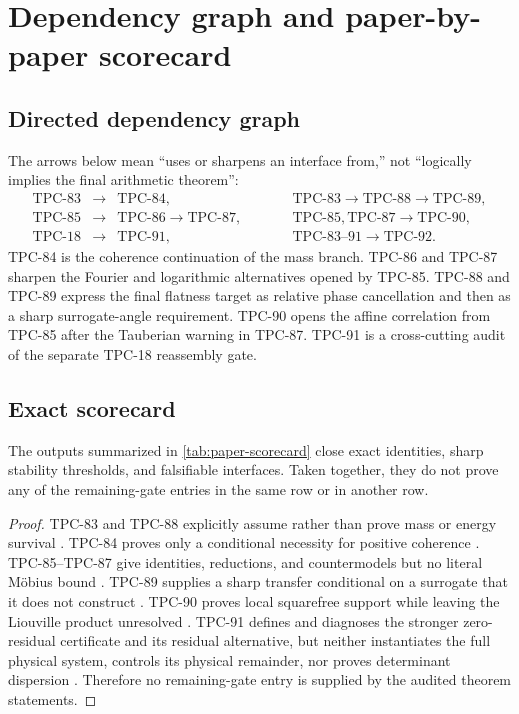 \section{Dependency graph and paper-by-paper scorecard}
\label{sec:dependency-graph}

\subsection{Directed dependency graph}

The arrows below mean ``uses or sharpens an interface from,'' not
``logically implies the final arithmetic theorem'':
\[
\begin{array}{rclcl}
\text{TPC-83} &\longrightarrow& \text{TPC-84},
&\qquad&
\text{TPC-83}\longrightarrow\text{TPC-88}
\longrightarrow\text{TPC-89},
\\[2mm]
\text{TPC-85} &\longrightarrow& \text{TPC-86}
\longrightarrow\text{TPC-87},
&&
\text{TPC-85},\text{TPC-87}\longrightarrow\text{TPC-90},
\\[2mm]
\text{TPC-18} &\longrightarrow& \text{TPC-91},
&&
\text{TPC-83--91}\longrightarrow\text{TPC-92}.
\end{array}
\]
TPC-84 is the coherence continuation of the mass branch.
TPC-86 and TPC-87 sharpen the Fourier and logarithmic alternatives
opened by TPC-85.  TPC-88 and TPC-89 express the final flatness target
as relative phase cancellation and then as a sharp surrogate-angle
requirement.  TPC-90 opens the affine correlation from TPC-85 after
the Tauberian warning in TPC-87.  TPC-91 is a cross-cutting audit of
the separate TPC-18 reassembly gate.

\subsection{Exact scorecard}

\begin{theorem}
\label{thm:dependency-audit}
The outputs summarized in \cref{tab:paper-scorecard} close exact identities,
sharp stability thresholds, and falsifiable interfaces.  Taken
together, they do not prove any of the remaining-gate entries in the
same row or in another row.
\end{theorem}

\begin{proof}
TPC-83 and TPC-88 explicitly assume rather than prove mass or energy
survival \citep{WangTPC83,WangTPC88}.  TPC-84 proves only a
conditional necessity for positive coherence
\citep{WangTPC84}.  TPC-85--TPC-87 give identities, reductions, and
countermodels but no literal M\"obius bound
\citep{WangTPC85,WangTPC86,WangTPC87}.  TPC-89 supplies a sharp
transfer conditional on a surrogate that it does not construct
\citep{WangTPC89}.  TPC-90 proves local squarefree support while
leaving the Liouville product unresolved \citep{WangTPC90}.  TPC-91
defines and diagnoses the stronger zero-residual certificate and its
residual alternative, but neither instantiates the full physical
system, controls its physical remainder, nor proves determinant dispersion
\citep{WangTPC91}.  Therefore no remaining-gate entry is supplied by
the audited theorem statements.
\end{proof}


